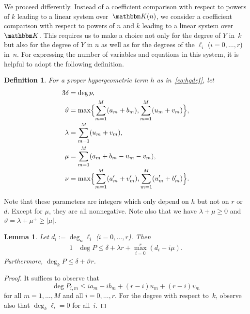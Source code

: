 \documentclass{sig-alternate}
\newtheorem{lemma}[theorem]{Lemma}
\newtheorem{defi}[theorem]{Definition}
\let\set\mathbbm
\def\K{\set K}
\def\deg{\operatorname{deg}}
\begin{document}
We proceed differently. Instead of a coefficient comparison with respect to powers
of $k$ leading to a linear system over~$\K(n)$, we consider a coefficient comparison
with respect to powers of $n$ and $k$ leading to a linear system over~$\K$. This
requires us to make a choice not only for the degree of $Y$ in~$k$ but also for the
degree of $Y$ in $n$ as well as for the degrees of the $\ell_i$ ($i=0,\dots,r$) in~$n$.
For expressing the number of variables and equations in this system, it is helpful
to adopt the following definition.

\begin{defi}\label{def:greek}
  For a proper hypergeometric term $h$ as in~\eqref{eq:hgdef}, let {\allowdisplaybreaks
  \begin{alignat*}3
       \delta &=\deg p,\\
    \vartheta &=\max\Bigl\{\sum_{m=1}^M (a_m+b_m),\sum_{m=1}^M (u_m+v_m)\Bigr\},\\[-2pt]
      \lambda &=\sum_{m=1}^M(u_m+v_m),\\
          \mu &=\sum_{m=1}^M (a_m+b_m-u_m-v_m),\\[-2pt]
          \nu &=\max\Bigl\{\sum_{m=1}^M (a'_m+v'_m),\sum_{m=1}^M (u'_m+b'_m)\Bigr\}.\\
  \end{alignat*}}
\end{defi}

Note that these parameters are integers which only depend on $h$ but not on $r$ or~$d$.
Except for $\mu$, they are all nonnegative. Note also that we have $\lambda+\mu\geq0$
and $\vartheta=\lambda+\mu^+\geq|\mu|$.

\begin{lemma}\label{lem:1}
  Let $d_i:=\deg_n\ell_i$ ($i=0,\dots,r$). Then
  \begin{alignat*}1
    &\deg P \leq \delta + \lambda r + \max_{i=0}^r (d_i + i \mu).
  \end{alignat*}
  Furthermore, $\deg_k P\leq \delta + \vartheta r$.
\end{lemma}
\begin{proof}
  It suffices to observe that
  \[
    \deg P_{i,m} \leq ia_m + ib_m + (r-i)u_m + (r-i)v_m
  \]
  for all $m=1,\dots,M$ and all $i=0,\dots,r$. For the degree with respect to~$k$,
  observe also that $\deg_k\ell_i=0$ for all~$i$.
\end{proof}
\end{document}
